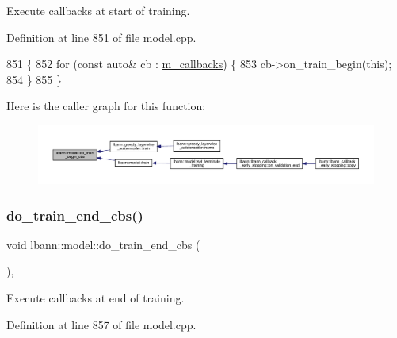 Execute callbacks at start of training. 

Definition at line 851 of file model.\+cpp.


\begin{DoxyCode}
851                                \{
852   \textcolor{keywordflow}{for} (\textcolor{keyword}{const} \textcolor{keyword}{auto}& cb : \hyperlink{classlbann_1_1model_a07b511fef30368494c2ad80922ffd0eb}{m\_callbacks}) \{
853     cb->on\_train\_begin(\textcolor{keyword}{this});
854   \}
855 \}
\end{DoxyCode}
Here is the caller graph for this function\+:\nopagebreak
\begin{figure}[H]
\begin{center}
\leavevmode
\includegraphics[width=350pt]{classlbann_1_1model_a780395fa740102adda5537aa5d257698_icgraph}
\end{center}
\end{figure}
\mbox{\label{classlbann_1_1model_a13bb6edae42c719b78454a8af9549122}} 
\subsubsection{\texorpdfstring{do\+\_\+train\+\_\+end\+\_\+cbs()}{do\_train\_end\_cbs()}}
{\footnotesize\ttfamily void lbann\+::model\+::do\+\_\+train\+\_\+end\+\_\+cbs (\begin{DoxyParamCaption}{ }\end{DoxyParamCaption})\hspace{0.3cm}{\ttfamily [protected]}, {\ttfamily [virtual]}}

Execute callbacks at end of training. 

Definition at line 857 of file model.\+cpp.



